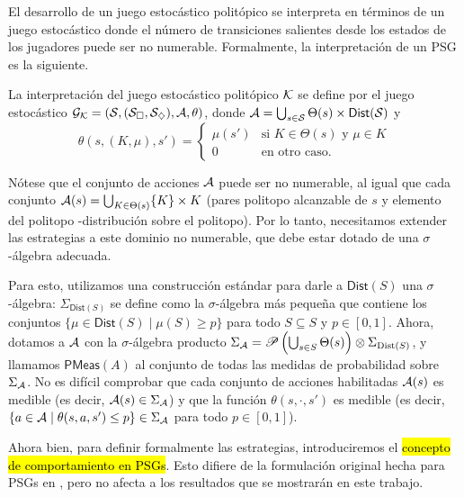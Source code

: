 El desarrollo de un juego estocástico politópico se interpreta en términos de
un juego estocástico donde el número de transiciones salientes desde los
estados de los jugadores puede ser no numerable. Formalmente, la interpretación
de un PSG es la siguiente.

\begin{definition}
	La interpretación del juego estocástico politópico \( \mathcal{K} \) se define por el juego estocástico \( \mathcal{G}_{\mathcal{K}} = (\mathcal{S}, (\mathcal{S}_\square, \mathcal{S}_\diamondsuit), \mathcal{A}, \theta) \), donde \( \mathcal{A} = \bigcup_{s \in \mathcal{S}} \Theta(s) \times \textsf{Dist}(\mathcal{S}) \) y
	\[
		\theta(s, (K, \mu), s') =
		\begin{cases}
			\mu(s') & \text{si } K \in \Theta(s) \text{ y } \mu \in K \\
			0 & \text{en otro caso}.
		\end{cases}
	\]
\end{definition}

Nótese que el conjunto de acciones \( \mathcal{A} \) puede ser no numerable, al igual
que cada conjunto \( \mathcal{A}(s) = \bigcup_{K \in \Theta(s)} \{K\} \times K \)
(pares politopo alcanzable de $s$ y elemento del politopo -distribución sobre
el politopo). Por lo tanto, necesitamos extender las estrategias a este dominio
no numerable, que debe estar dotado de una \( \sigma \)-álgebra adecuada.

Para esto, utilizamos una construcción estándar para darle a \(
\textsf{Dist}(S) \) una \( \sigma \)-álgebra: \( \Sigma_{\textsf{Dist}(S)} \)
se define como la \( \sigma \)-álgebra más pequeña que contiene los conjuntos
\( \{\mu \in \textsf{Dist}(S) \mid \mu(S) \geq p\} \) para todo \( S \subseteq
S \) y \( p \in [0, 1] \). Ahora, dotamos a \( \mathcal{A} \) con la \( \sigma
\)-álgebra producto \( \Sigma_{\mathcal{A}} = \mathscr{P} \left(\bigcup_{s \in S}
\Theta(s)\right) \otimes \Sigma_{\text{Dist}(S)} \), y llamamos \(
\textsf{PMeas}(A) \) al conjunto de todas las medidas de probabilidad sobre \(
\Sigma_{\mathcal{A}} \). No es difícil comprobar que cada conjunto de acciones
habilitadas \( \mathcal{A}(s) \) es medible (es decir, \( \mathcal{A}(s) \in \Sigma_{\mathcal{A}} \))
y que la función \( \theta(s, \cdot, s') \) es medible (es decir, \( \{a \in
\mathcal{A} \mid \theta(s, a, s') \leq p\} \in \Sigma_{\mathcal{A}} \) para todo \( p \in [0,
	1] \)).

Ahora bien, para definir formalmente las estrategias, introduciremos el
\hl{concepto de comportamiento en PSGs}. Esto difiere de la formulación
original hecha para PSGs en \cite{Polytopal}, pero no afecta a los resultados
que se mostrarán en este trabajo.

